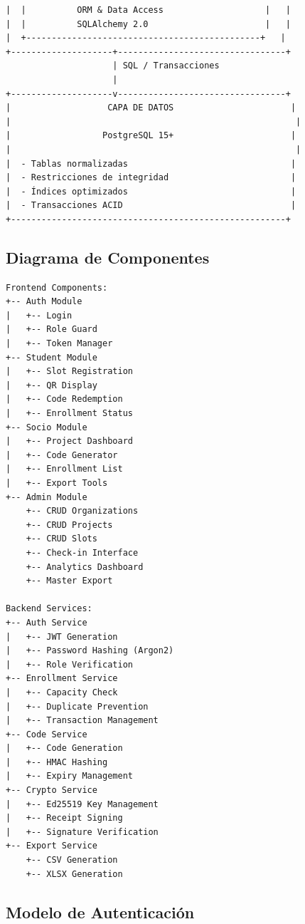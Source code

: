 \documentclass[12pt,a4paper]{article}
\begin{document}
\begin{verbatim}
|  |          ORM & Data Access                    |   |
|  |          SQLAlchemy 2.0                       |   |
|  +----------------------------------------------+   |
+--------------------+---------------------------------+
                     | SQL / Transacciones
                     |
+--------------------v---------------------------------+
|                   CAPA DE DATOS                       |
|                                                        |
|                  PostgreSQL 15+                       |
|                                                        |
|  - Tablas normalizadas                                |
|  - Restricciones de integridad                        |
|  - Índices optimizados                                |
|  - Transacciones ACID                                 |
+------------------------------------------------------+
\end{verbatim}

\subsection{Diagrama de Componentes}

\begin{verbatim}
Frontend Components:
+-- Auth Module
|   +-- Login
|   +-- Role Guard
|   +-- Token Manager
+-- Student Module
|   +-- Slot Registration
|   +-- QR Display
|   +-- Code Redemption
|   +-- Enrollment Status
+-- Socio Module
|   +-- Project Dashboard
|   +-- Code Generator
|   +-- Enrollment List
|   +-- Export Tools
+-- Admin Module
    +-- CRUD Organizations
    +-- CRUD Projects
    +-- CRUD Slots
    +-- Check-in Interface
    +-- Analytics Dashboard
    +-- Master Export

Backend Services:
+-- Auth Service
|   +-- JWT Generation
|   +-- Password Hashing (Argon2)
|   +-- Role Verification
+-- Enrollment Service
|   +-- Capacity Check
|   +-- Duplicate Prevention
|   +-- Transaction Management
+-- Code Service
|   +-- Code Generation
|   +-- HMAC Hashing
|   +-- Expiry Management
+-- Crypto Service
|   +-- Ed25519 Key Management
|   +-- Receipt Signing
|   +-- Signature Verification
+-- Export Service
    +-- CSV Generation
    +-- XLSX Generation
\end{verbatim}

\subsection{Modelo de Autenticación}
\end{document}
